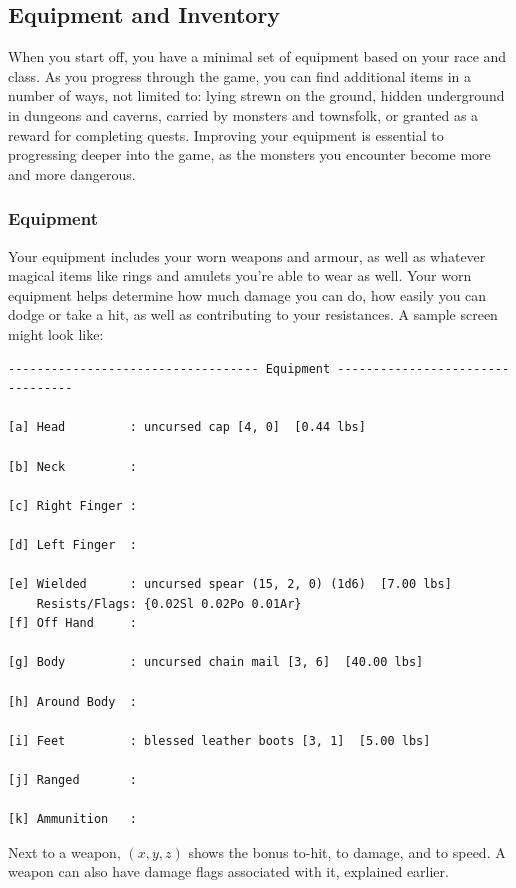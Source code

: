 \subsection{Equipment and Inventory}

When you start off, you have a minimal set of equipment based on your race
and class.  As you progress through the game, you can find additional items
in a number of ways, not limited to: lying strewn on the ground, hidden 
underground in dungeons and caverns, carried by monsters and townsfolk, or 
granted as a reward for completing quests.  Improving your equipment is
essential to progressing deeper into the game, as the monsters you encounter
become more and more dangerous.

\subsubsection{Equipment}

Your equipment includes your worn weapons and armour, as well as whatever
magical items like rings and amulets you're able to wear as well.  Your
worn equipment helps determine how much damage you can do, how easily you can
dodge or take a hit, as well as contributing to your resistances.  A sample
screen might look like:

\begin{verbatim}
----------------------------------- Equipment ---------------------------------

[a] Head         : uncursed cap [4, 0]  [0.44 lbs]

[b] Neck         :

[c] Right Finger :

[d] Left Finger  :

[e] Wielded      : uncursed spear (15, 2, 0) (1d6)  [7.00 lbs] 
    Resists/Flags: {0.02Sl 0.02Po 0.01Ar}
[f] Off Hand     :

[g] Body         : uncursed chain mail [3, 6]  [40.00 lbs]

[h] Around Body  :

[i] Feet         : blessed leather boots [3, 1]  [5.00 lbs]

[j] Ranged       :

[k] Ammunition   :

\end{verbatim}

Next to a weapon, \((x, y, z)\) shows the bonus to-hit, to damage, and to speed.
A weapon can also have damage flags associated with it, explained earlier.

